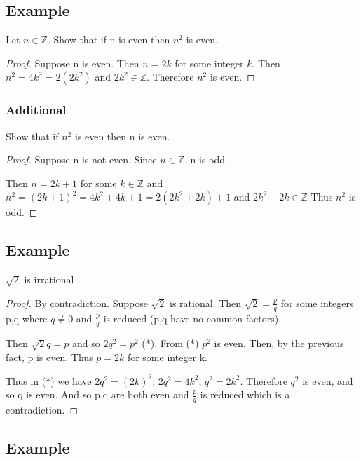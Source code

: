 \documentclass[12pt, letterpaper]{article}
\begin{document}
    \subsection{Example}

    Let $n \in \mathbb{Z}$. Show that if n is even then $n^2$ is even.

    \begin{proof}
        Suppose n is even. Then $n = 2k$ for some integer $k$. Then $n^2 = 4k^2 = 2(2k^2)$
        and $2k^2 \in\mathbb{Z}$. Therefore $n^2$ is even.
    \end{proof}

    \subsubsection{Additional}

    Show that if $n^2$ is even then n is even.

    \begin{proof}
        Suppose n is not even. Since $n\in \mathbb{Z}$, n is odd. 

        Then $n = 2k+1$ for some $k \in \mathbb{Z}$ and $n^2 = (2k+1)^2 = 4k^2 + 4k +1
        = 2(2k^2 + 2k) + 1$ and $2k^2 + 2k \in \mathbb{Z}$ Thus $n^2$ is odd.
    \end{proof}

    \subsection{Example}

    $\sqrt{2}$ is irrational

    \begin{proof}
        By contradiction. Suppose $\sqrt{2}$ is rational. Then $\sqrt{2} = \frac{p}{q}$ for
        some integers p,q where $q \neq 0$ and $\frac{p}{q}$ is reduced (p,q have no
        common factors).
        
        Then $\sqrt{2} \dot q = p$ and so $2q^2 = p^2$ (*). From (*) $p^2$ is even. Then, by
        the previous fact, p is even. Thus $p = 2k$ for some integer k.
        
        Thus in (*) we have $2q^2 = (2k)^2$; $2q^2 = 4k^2$; $q^2=2k^2$.
        Therefore $q^2$ is even, and so q is even.
        And so p,q are both even and $\frac{p}{q}$ is reduced which is a contradiction.
    \end{proof}

    \subsection{Example}
\end{document}
